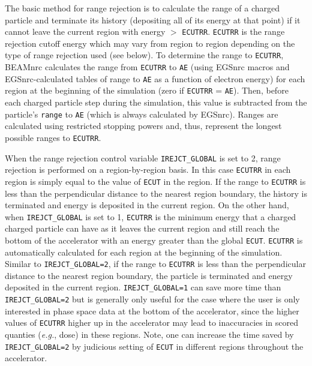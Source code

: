 \documentclass[12pt,twoside]{article}
\begin{document}
The basic method for range rejection is to calculate the range of a charged particle and
terminate its history (depositing all of its energy at that point)
if it cannot leave the current region with
energy $>$ {\tt ECUTRR}.  {\tt ECUTRR} is the range
rejection cutoff energy which may vary
from region to region depending on the type of range rejection used
(see below).
  To
determine the range to {\tt ECUTRR}, BEAMnrc calculates the range from
{\tt ECUTRR} to {\tt AE} (using EGSnrc macros and EGSnrc-calculated
tables of range to {\tt AE} as a function of electron energy) for each
region at the beginning of the simulation (zero if {\tt ECUTRR} = {\tt AE}).
Then, before each charged particle
step during the simulation, this value is subtracted from the particle's
{\tt range} to {\tt AE} (which is always calculated by EGSnrc).
Ranges are calculated using restricted stopping powers and, thus,
represent
the longest possible ranges to {\tt ECUTRR}.

When the range rejection control variable
\verb+IREJCT_GLOBAL+ is set to 2, range rejection is
performed on a region-by-region basis.  In this case {\tt ECUTRR} in
each region is simply equal to the value of {\tt ECUT} in the region.
If the range to {\tt ECUTRR} is less than the perpendicular distance to
the nearest region boundary,
the history is terminated and energy is deposited in the current region.
On the other hand,
when \verb+IREJCT_GLOBAL+ is set to 1, {\tt ECUTRR} is the minimum energy
that a charged charged particle can have as it
leaves the current region and still reach the bottom of the
accelerator with an energy greater than the global \verb+ECUT+.
\verb+ECUTRR+ is automatically calculated for each region at the beginning of
the simulation.  Similar to {\tt IREJCT\_GLOBAL=2}, if the range to
\verb+ECUTRR+ is less than the perpendicular distance to the nearest region
boundary, the
particle is terminated and energy deposited in the current region.
\verb+IREJCT_GLOBAL=1+ can save more time than
\verb+IREJCT_GLOBAL=2+ but is generally only useful for the case where the user
is only interested in phase space data at the bottom of the accelerator, since
the higher values of \verb+ECUTRR+ higher up in the accelerator may lead to
inaccuracies in scored quanties ({\em e.g.}, dose) in these regions.
Note, one can increase the time saved by \verb+IREJCT_GLOBAL=2+ by
judicious setting of \verb+ECUT+ in different regions throughout the accelerator.
\end{document}
